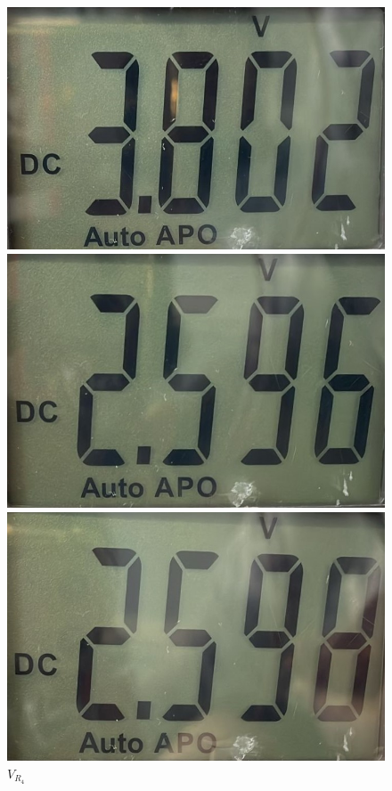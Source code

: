 \begin{figure}[h]
\begin{minipage}{.25\textwidth}
        \caption{$V_{R_2}$}
        \label{fig:exp_r2}
    \end{minipage}%
    \begin{minipage}{.25\textwidth}
        \includegraphics[width=0.9\linewidth]{assets/exp_r3.jpeg}
        \caption{$V_{R_3}$}
        \label{fig:exp_r3}
    \end{minipage}
    \begin{minipage}{.25\textwidth}
        \includegraphics[width=0.9\linewidth]{assets/exp_r4.jpeg}
        \caption{$V_{R_4}$}
        \label{fig:exp_r4}
    \end{minipage}%
    \begin{minipage}{.25\textwidth}
        \includegraphics[width=0.9\linewidth]{assets/exp_r5.jpeg}

\end{minipage}
\end{figure}
